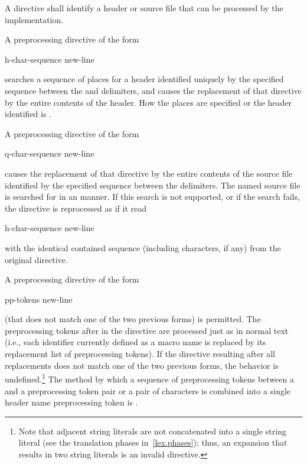\pnum
A
directive shall identify a header or source file
that can be processed by the implementation.

\pnum
{}%
A preprocessing directive of the form

\begin{ncsimplebnf}
h-char-sequence\terminal{>} new-line
\end{ncsimplebnf}

searches a sequence of
places
for a header identified uniquely by the specified sequence
between the
\tcode{<}
and
\tcode{>}
delimiters,
and causes the replacement of that
directive by the entire contents of the header.
How the places are specified
or the header identified
is .

\pnum
{}%
A preprocessing directive of the form

\begin{ncsimplebnf}
q-char-sequence new-line
\end{ncsimplebnf}

causes the replacement of that
directive by the entire contents of the
source file identified by the specified sequence between the
delimiters.
The named source file is searched for in an
manner.
If this search is not supported,
or if the search fails,
the directive is reprocessed as if it read

\begin{ncsimplebnf}
h-char-sequence\terminal{>} new-line
\end{ncsimplebnf}

with the identical contained sequence (including
\tcode{>}
characters, if any) from the original directive.

\pnum
A preprocessing directive of the form

\begin{ncsimplebnf}
 pp-tokens new-line
\end{ncsimplebnf}

(that does not match one of the two previous forms) is permitted.
The preprocessing tokens after
in the directive are processed just as in normal text
(i.e., each identifier currently defined as a macro name is replaced by its
replacement list of preprocessing tokens).
If the directive resulting after all replacements does not match
one of the two previous forms, the behavior is
undefined.\footnote{Note that adjacent string literals are not concatenated into
a single string literal
(see the translation phases in~\ref{lex.phases});
thus, an expansion that results in two string literals is an
invalid directive.}
The method by which a sequence of preprocessing tokens between a
\tcode{<}
and a
\tcode{>}
preprocessing token pair or a pair of
characters is combined into a single header name
preprocessing token is .

